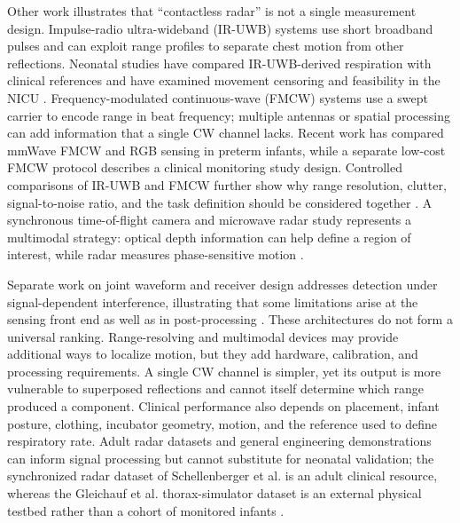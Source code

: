 Other work illustrates that ``contactless radar'' is not a single measurement design. Impulse-radio
ultra-wideband (IR-UWB) systems use short broadband pulses and can exploit range profiles to
separate chest motion from other reflections. Neonatal studies have compared IR-UWB-derived
respiration with clinical references and have examined movement censoring and feasibility in the
NICU \citep{kim2019noncontact,lee2020feasibility}. Frequency-modulated continuous-wave (FMCW)
systems use a swept carrier to encode range in beat frequency; multiple antennas or spatial
processing can add information that a single CW channel lacks. Recent work has compared mmWave
FMCW and RGB sensing in preterm infants, while a separate low-cost FMCW protocol describes a
clinical monitoring study design. Controlled comparisons of IR-UWB and FMCW further show why
range resolution, clutter, signal-to-noise ratio, and the task definition should be considered
together \citep{liao2025noncontact,hari2025contactless,wang2020experimental}. A synchronous
time-of-flight camera and microwave radar study represents a multimodal strategy: optical depth
information can help define a region of interest, while radar measures phase-sensitive motion
\citep{gleichauf2021automated}.

{\sloppy
Separate work on joint waveform and receiver design addresses detection under signal-dependent
interference, illustrating that some limitations arise at the sensing front end as well as in
post-processing \citep{beltrao2020joint}. These architectures do not form a universal ranking.
Range-resolving and multimodal devices may
provide additional ways to localize motion, but they add hardware, calibration, and processing
requirements. A single CW channel is simpler, yet its output is more vulnerable to superposed
reflections and cannot itself determine which range produced a component. Clinical performance
also depends on placement, infant posture, clothing, incubator geometry, motion, and the reference
used to define respiratory rate. Adult radar datasets and general engineering demonstrations can
inform signal processing but cannot substitute for neonatal validation; the synchronized radar
dataset of Schellenberger et al. is an adult clinical resource, whereas the Gleichauf et al.
thorax-simulator dataset is an external physical testbed rather than a cohort of monitored infants
\citep{schellenberger2020dataset,gleichauf2024time}.
\par}


